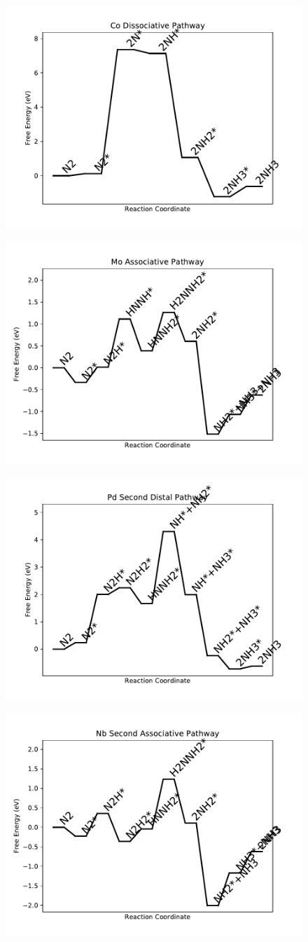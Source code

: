 \documentclass[journal=jacsat,manuscript=article]{achemso}
\begin{document}
\begin{figure}
\includegraphics[width=0.5\linewidth]{data/plots/Co_dissociative.pdf}
\label{fig:Co_dissociative}
\end{figure}

\newpage
\begin{figure}
\includegraphics[width=0.5\linewidth]{data/plots/Mo_associative.pdf}
\label{fig:Mo_associative}
\end{figure}

\begin{figure}
\includegraphics[width=0.5\linewidth]{data/plots/Pd_distal_2.pdf}
\label{fig:Pd_distal_2}
\end{figure}

\newpage
\begin{figure}
\includegraphics[width=0.5\linewidth]{data/plots/Nb_associative_2.pdf}
\label{fig:Nb_associative_2}
\end{figure}
\end{document}
